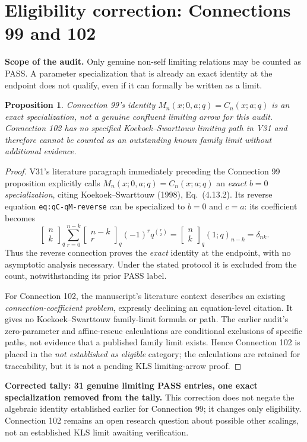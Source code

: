 \documentclass[11pt]{article}
\newtheorem{proposition}{Proposition}
\begin{document}
\section{Eligibility correction: Connections 99 and 102}
\noindent\textbf{Scope of the audit.} Only genuine non-self limiting relations may be counted as PASS. A parameter specialization that is already an exact identity at the endpoint does not qualify, even if it can formally be written as a limit.

\begin{proposition}
Connection 99's identity $M_n(x;0,a;q)=C_n(x;a;q)$ is an exact specialization, not a genuine confluent limiting arrow for this audit. Connection 102 has no specified Koekoek--Swarttouw limiting path in V31 and therefore cannot be counted as an outstanding \emph{known} family limit without additional evidence.
\end{proposition}
\begin{proof}
V31's literature paragraph immediately preceding the Connection 99 proposition explicitly calls $M_n(x;0,a;q)=C_n(x;a;q)$ an \emph{exact $b=0$ specialization}, citing Koekoek--Swarttouw (1998), Eq.~(4.13.2). Its reverse equation \texttt{eq:qC-qM-reverse} can be specialized to $b=0$ and $c=a$: its coefficient becomes
\[
\begin{bmatrix}n\\k\end{bmatrix}_q
\sum_{r=0}^{n-k}\begin{bmatrix}n-k\\r\end{bmatrix}_q
(-1)^r q^{\binom r2}
=\begin{bmatrix}n\\k\end{bmatrix}_q(1;q)_{n-k}=\delta_{nk}.
\]
Thus the reverse connection proves the \emph{exact} identity at the endpoint, with no asymptotic analysis necessary. Under the stated protocol it is excluded from the count, notwithstanding its prior PASS label.

For Connection 102, the manuscript's literature context describes an existing \emph{connection-coefficient problem}, expressly declining an equation-level citation. It gives no Koekoek--Swarttouw family-limit formula or path. The earlier audit's zero-parameter and affine-rescue calculations are conditional exclusions of specific paths, not evidence that a published family limit exists. Hence Connection 102 is placed in the \emph{not established as eligible} category; the calculations are retained for traceability, but it is not a pending KLS limiting-arrow proof.
\end{proof}
\noindent\textbf{Corrected tally: 31 genuine limiting PASS entries, one exact specialization removed from the tally.} This correction does not negate the algebraic identity established earlier for Connection 99; it changes only eligibility. Connection 102 remains an open research question about possible other scalings, not an established KLS limit awaiting verification.
\end{document}
